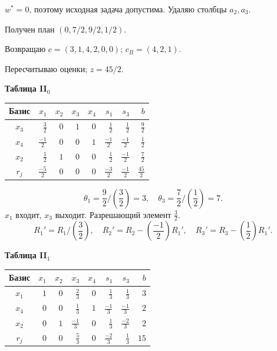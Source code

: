 \documentclass[12pt,a4paper]{article}
\begin{document}
$w^*=0$, поэтому исходная задача допустима. Удаляю столбцы $a_2,a_3$.
\par Получен план $(0,7/2,9/2,1/2)$.
\par Возвращаю $c=(3,1,4,2,0,0)$; $c_B=(4,2,1)$.
\par Пересчитываю оценки; $z=45/2$.
\par\textbf{Таблица II$_{0}$}\begin{center}\small\setlength{\tabcolsep}{4pt}\begin{tabular}{c|rrrrrr|r}\hline
Базис & \cellcolor{cyan!18}$x_{1}$ & $x_{2}$ & $x_{3}$ & $x_{4}$ & $s_{1}$ & $s_{3}$ & $b$\\\hline
\rowcolor{yellow!25}$x_{3}$ & \cellcolor{orange!45}$\frac{3}{2}$ & $0$ & $1$ & $0$ & $\frac{1}{2}$ & $\frac{1}{2}$ & $\frac{9}{2}$\\
$x_{4}$ & \cellcolor{cyan!18}$\frac{-1}{2}$ & $0$ & $0$ & $1$ & $\frac{-1}{2}$ & $\frac{-1}{2}$ & $\frac{1}{2}$\\
$x_{2}$ & \cellcolor{cyan!18}$\frac{1}{2}$ & $1$ & $0$ & $0$ & $\frac{1}{2}$ & $\frac{-1}{2}$ & $\frac{7}{2}$\\
\hline $r_j$ & \cellcolor{cyan!18}$\frac{-5}{2}$ & $0$ & $0$ & $0$ & $\frac{-3}{2}$ & $\frac{-1}{2}$ & $\frac{45}{2}$\\\hline\end{tabular}\end{center}
\[\theta_{1}=\frac{9}{2}/(\frac{3}{2})=3,\quad \theta_{3}=\frac{7}{2}/(\frac{1}{2})=7.\]
$x_{1}$ входит, $x_{3}$ выходит. Разрешающий элемент $\frac{3}{2}$.
{\small\[R_{1}'=R_{1}/(\frac{3}{2}),\quad R_{2}'=R_{2}-(\frac{-1}{2})R_{1}',\quad R_{3}'=R_{3}-(\frac{1}{2})R_{1}'.\]}
\par\textbf{Таблица II$_{1}$}\begin{center}\small\setlength{\tabcolsep}{4pt}\begin{tabular}{c|rrrrrr|r}\hline
Базис & $x_{1}$ & $x_{2}$ & $x_{3}$ & $x_{4}$ & \cellcolor{cyan!18}$s_{1}$ & $s_{3}$ & $b$\\\hline
$x_{1}$ & $1$ & $0$ & $\frac{2}{3}$ & $0$ & \cellcolor{cyan!18}$\frac{1}{3}$ & $\frac{1}{3}$ & $3$\\
$x_{4}$ & $0$ & $0$ & $\frac{1}{3}$ & $1$ & \cellcolor{cyan!18}$\frac{-1}{3}$ & $\frac{-1}{3}$ & $2$\\
\rowcolor{yellow!25}$x_{2}$ & $0$ & $1$ & $\frac{-1}{3}$ & $0$ & \cellcolor{orange!45}$\frac{1}{3}$ & $\frac{-2}{3}$ & $2$\\
\hline $r_j$ & $0$ & $0$ & $\frac{5}{3}$ & $0$ & \cellcolor{cyan!18}$\frac{-2}{3}$ & $\frac{1}{3}$ & $15$\\\hline\end{tabular}\end{center}
\end{document}
